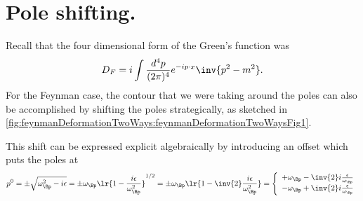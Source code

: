 %
%
\section{Pole shifting.}

Recall that the four dimensional form of the Green's function was
\begin{dmath}\label{eqn:qftLecture13:400}
D_F = i \int \frac{d^4 p}{(2 \pi)^4} e^{-i p \cdot x} \inv{ p^2 - m^2 }.
\end{dmath}
For the Feynman case, the contour that we were taking around the poles can also be accomplished by shifting the poles strategically, as sketched in \cref{fig:feynmanDeformationTwoWays:feynmanDeformationTwoWaysFig1}.


This shift can be expressed explicit algebraically by introducing an offset
which puts the poles at
\begin{dmath}\label{eqn:qftLecture13:440}
p^0
= \pm \sqrt{ \omega_\Bp^2 - i \epsilon }
= \pm \omega_\Bp \lr{ 1 - \frac{i \epsilon}{\omega_\Bp^2} }^{1/2}
= \pm \omega_\Bp \lr{ 1 - \inv{2} \frac{i \epsilon}{\omega_\Bp^2} }
=
\left\{
\begin{array}{l}
+\omega_\Bp - \inv{2} i \frac{\epsilon}{\omega_\Bp} \\
-\omega_\Bp + \inv{2} i \frac{\epsilon}{\omega_\Bp} \\
\end{array}
\right.
\end{dmath}

